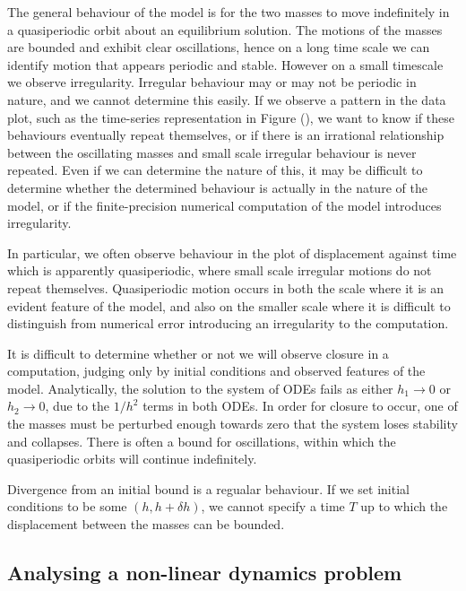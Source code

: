 \documentclass{article}
\begin{document}
The general behaviour of the model is for the two masses to move indefinitely in a quasiperiodic orbit about an equilibrium solution.
The motions of the masses are bounded and exhibit clear oscillations,
hence on a long time scale we can identify motion that appears periodic and stable.
However on a small timescale we observe irregularity.
Irregular behaviour may or may not be periodic in nature, and we cannot determine this easily.
If we observe a pattern in the data plot, such as the time-series representation in Figure (), %
we want to know if these behaviours eventually repeat themselves,
or if there is an irrational relationship between the oscillating masses and small scale irregular behaviour is never repeated.
Even if we can determine the nature of this,
it may be difficult to determine whether the determined behaviour is actually in the nature of the model,
or if the finite-precision numerical computation of the model introduces irregularity.

In particular, we often observe behaviour in the plot of displacement against time which is apparently quasiperiodic,
where small scale irregular motions do not repeat themselves.
Quasiperiodic motion occurs in both the scale where it is an evident feature of the model,
and also on the smaller scale where it is difficult to distinguish from numerical error introducing an irregularity to the computation.

It is difficult to determine whether or not we will observe closure in a computation,
judging only by initial conditions and observed features of the model.
Analytically, the solution to the system of ODEs fails as either \(h_1\rightarrow 0\) or \(h_2 \rightarrow 0\),
due to the \(1/h^2\) terms in both ODEs.
In order for closure to occur,
one of the masses must be perturbed enough towards zero that the system loses stability and collapses.
There is often a bound for oscillations, within which the quasiperiodic orbits will continue indefinitely.

Divergence from an initial bound is a regualar behaviour.
If we set initial conditions to be some \((h,h+\delta h)\),
we cannot specify a time $T$ up to which the displacement between the masses can be bounded.

\subsection{Analysing a non-linear dynamics problem}
\end{document}
